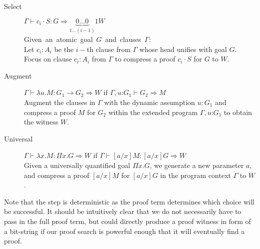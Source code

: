 \documentclass{llncs}
\newcommand{\fighead}{\hrule\vspace{1.5ex}}
\newcommand{\vd}{\vdash}
\newcommand{\arrow}{\rightarrow}
\newcommand{\oftp}{\mathord{:}}
\begin{document}
\begin{small}
\begin{description}
\item[Select] $\Gamma \vd c_i \cdot S: G \Rightarrow
  \underset{1 \ldots (i-1)}{\underbrace{0\ldots 0}}1
W $ \\
    \mbox{Given an atomic goal $G$ and clauses $\Gamma$:}\hfill\\
     Let $c_i : A_i$ be the $i-$th clause from $\Gamma$ whose head 
     unifies with goal $G$.\\
    Focus on clause $c_i : A_i$ from $\Gamma$ to compress a proof
     $c_i\cdot S$ for $G$ to $W$.

\item[Augment] $\Gamma \vd   \lambda u. M : G_1 \arrow G_2 \Rightarrow
  W$ if $\Gamma,
  u\oftp G_1 \vd G_2 \Rightarrow M$ \\
Augment the clauses in $\Gamma$ with the dynamic assumption $u{:} G_1$ and
compress a proof $M$ for $G_2$ within the extended program
$\Gamma, u \oftp G_1$ to obtain the witness $W$. 
\item[Universal] $\Gamma \vd  \lambda x. M : \Pi x. G \Rightarrow W$ if $\Gamma \vd
  [a/x]M: [a/x]G\Rightarrow W$  \\ %
Given a universally quantified goal $\Pi x. G$, we generate a new
parameter $a$, and compress a proof $[a/x]M$  for $[a/x]G$ in the
program context $\Gamma$ to $W$.\\
\end{description}
\end{small}    
%

Note that the {} step is deterministic as the proof term
determines which choice will be successful. It should be intuitively
clear that we do not necessarily have to pass in the full proof term,
but could directly produce a proof witness in form of a bit-string if
our proof search is powerful enough that it will eventually find a
proof.
\end{document}
